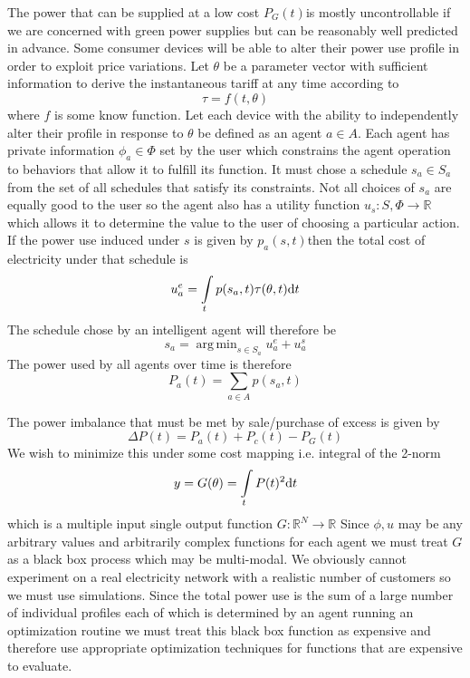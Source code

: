 \documentclass[11pt]{article}
\DeclareMathOperator*{\argmin}{arg\,min}
\begin{document}
The power that can be supplied at a low cost $P_{G} (t)$is mostly uncontrollable if
we are concerned with green power supplies but can be reasonably well predicted
in advance.
Some consumer devices will be able to alter their power use profile in order to
exploit price variations. Let $\theta$ be a parameter vector with sufficient information
to derive the instantaneous tariff at any time according to
\begin{equation}
\tau = f(t, \theta)
\end{equation}
where $f$ is some know function. Let each device with the ability to independently alter their profile in response to $\theta$ be defined as an agent $a \in A$.
Each agent has private information $\phi_{a} \in \Phi $ set by the user which constrains the
agent operation to behaviors that allow it to fulfill its function. It must chose a
schedule $s_{a} \in S_{a}$ from the set of all schedules that satisfy its constraints. Not all
choices of $s_{a}$ are equally good to the user so the agent also has a utility function
$u_{s} : S, \Phi \rightarrow \mathbb{R} $ which allows it to determine the value to the user of choosing a
particular action. If the power use induced under $s$ is given by $ p_{a} (s, t) $then the total cost of
electricity under that schedule is
\begin{equation}
u_{a}^{e} = \intop_{t} p(s_{a}, t) \tau(\theta, t) \mathrm{d}t
\end{equation}
The schedule chose by an intelligent agent will therefore be
\begin{equation}
s_{a} = \argmin _{s \in S_{a}} u_{a}^{e} + u_{a}^{s}
\end{equation}
The power used by all agents over time is therefore
\begin{equation}
P_{a}(t) = \sum_{a \in A} p (s_{a} , t)
\end{equation}

The power imbalance that must be met by sale/purchase of excess is given
by
\begin{equation}
\Delta P (t) = P_{a} (t) + P_{c} (t) - P_{G} (t)
\end{equation}
We wish to minimize this under some cost mapping i.e. integral of the 2-norm
\begin{equation}
y = G(\theta) = \intop_{t} P (t)^{2} \mathrm{d}t
\end{equation}
which is a multiple input single output function $G : \mathbb{R}^{N} \rightarrow \mathbb{R}$
Since $\phi, u$ may be any arbitrary values and arbitrarily complex functions for
each agent we must treat $G$ as a black box process which may be multi-modal.
We obviously cannot experiment on a real electricity network with a realistic
number of customers so we must use simulations. Since the total power use is
the sum of a large number of individual profiles each of which is determined by
an agent running an optimization routine we must treat this black box function
as expensive and therefore use appropriate optimization techniques for functions
that are expensive to evaluate.
\end{document}
